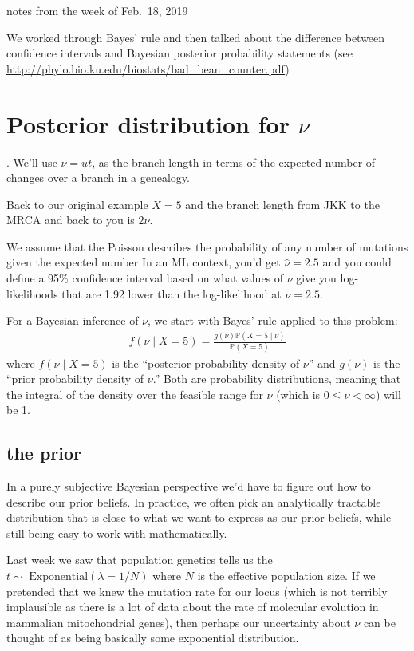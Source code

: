 \documentclass[11pt]{article}
\renewcommand{\Pr}{\mathbb{P}}
\begin{document}
notes from the week of Feb.~18, 2019 \\
\tableofcontents

We worked through Bayes' rule and then talked about the difference
between confidence intervals and Bayesian posterior probability
statements (see \url{http://phylo.bio.ku.edu/biostats/bad_bean_counter.pdf})

\section{Posterior distribution for $\nu$}.
We'll use $\nu = ut$, as the branch length in terms of the expected number of changes
    over a branch in a genealogy.

Back to our original example $X=5$ and the branch length from JKK to the MRCA and back to 
you is $2\nu$.

We assume that the Poisson describes the probability of any number of mutations given
    the expected number
In an ML context, you'd get $\hat{\nu} = 2.5$ and you could define a 95\% confidence interval
    based on what values of $\nu$ give you log-likelihoods that are 1.92 lower than
    the log-likelihood at $\nu = 2.5$.

For a Bayesian inference of $\nu$, we start with Bayes' rule applied to this problem:
\begin{eqnarray}
f(\nu\mid X=5) = \frac{g(\nu)\Pr(X=5\mid \nu)}{\Pr(X=5)}
\end{eqnarray}
where $f(\nu\mid X=5)$ is the ``posterior probability density of $\nu$'' and
$g(\nu)$ is the ``prior probability density of $\nu$.''
Both are probability distributions, meaning that the integral
of the density over
the feasible range for $\nu$ (which is $0\leq\nu < \infty$) will be 1.

\subsection{the prior}
In a purely subjective Bayesian perspective we'd have to figure out
    how to describe our prior beliefs.
In practice, we often pick an analytically tractable distribution
    that is close to what we want to express as our prior beliefs, while
    still being easy to work with mathematically.

Last week we saw that population genetics tells us the $t\sim\mbox{ Exponential}(\lambda=1/N)$ where $N$ is the effective population size.
If we pretended that we knew the mutation rate for our locus (which
is not terribly implausible as there is a lot of data about the rate
of molecular evolution in mammalian mitochondrial genes), then
perhaps our uncertainty about $\nu$ can be thought of as being 
basically some exponential distribution.
\end{document}
